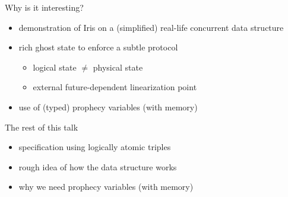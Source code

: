 \begin{frame}{Why is it interesting?}
\begin{itemize}
	\item demonstration of Iris on a (simplified) real-life concurrent data structure
	\item rich ghost state to enforce a subtle protocol
		\begin{itemize}
			\item logical state $\neq$ physical state
			\item external future-dependent linearization point
		\end{itemize}
	\item use of (typed) prophecy variables (with memory)
\end{itemize}
\end{frame}

\begin{frame}{The rest of this talk}
\begin{itemize}
	\item specification using logically atomic triples
	\item rough idea of how the data structure works
	\item why we need prophecy variables (with memory)
\end{itemize}
\end{frame}